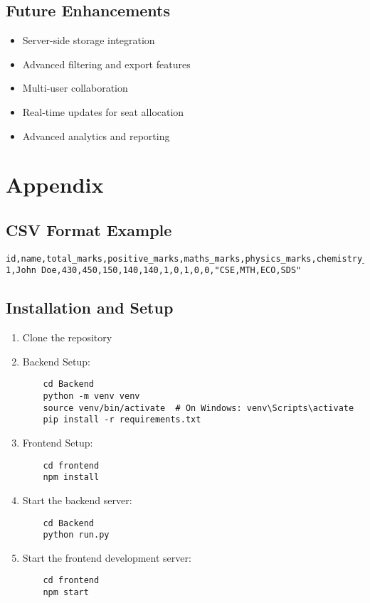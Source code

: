 \documentclass[12pt,a4paper]{article}
\begin{document}
\subsection{Future Enhancements}
\begin{itemize}
    \item Server-side storage integration
    \item Advanced filtering and export features
    \item Multi-user collaboration
    \item Real-time updates for seat allocation
    \item Advanced analytics and reporting
\end{itemize}
\newpage
\section{Appendix}
\subsection{CSV Format Example}
\begin{lstlisting}
id,name,total_marks,positive_marks,maths_marks,physics_marks,chemistry_marks,imotc,ioitc,inpho,incho,inbo,preference_order 
1,John Doe,430,450,150,140,140,1,0,1,0,0,"CSE,MTH,ECO,SDS"
\end{lstlisting}

\subsection{Installation and Setup}
\begin{enumerate}
    \item Clone the repository
    \item Backend Setup:
    \begin{lstlisting}
    cd Backend
    python -m venv venv
    source venv/bin/activate  # On Windows: venv\Scripts\activate
    pip install -r requirements.txt
    \end{lstlisting}
    \item Frontend Setup:
    \begin{lstlisting}
    cd frontend
    npm install
    \end{lstlisting}
    \item Start the backend server:
    \begin{lstlisting}
    cd Backend
    python run.py
    \end{lstlisting}
    \item Start the frontend development server:
    \begin{lstlisting}
    cd frontend
    npm start
    \end{lstlisting}
\end{enumerate}
\end{document}
